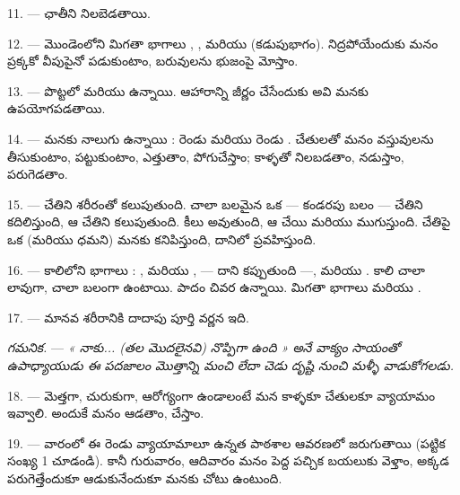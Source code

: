 11. ---  ఛాతీని నిలబెడతాయి.

12. --- మొండెంలోని మిగతా భాగాలు , ,  మరియు
 (కడుపుభాగం). నిద్రపోయేందుకు మనం ప్రక్కకో వీపుపైనో పడుకుంటాం, బరువులను భుజంపై
మోస్తాం.

13. --- పొట్టలో  మరియు  ఉన్నాయి. ఆహారాన్ని జీర్ణం చేసేందుకు అవి
మనకు ఉపయోగపడతాయి.

\VUsaut{4.4mm}
\VUsaut{3.0mm}

14. --- మనకు నాలుగు  ఉన్నాయి : రెండు  మరియు రెండు
. చేతులతో మనం వస్తువులను తీసుకుంటాం, పట్టుకుంటాం, ఎత్తుతాం, పోగుచేస్తాం;
కాళ్ళతో నిలబడతాం, నడుస్తాం, పరుగెడతాం.

15. ---  చేతిని శరీరంతో కలుపుతుంది. చాలా బలమైన ఒక  — కండరపు బలం —
చేతిని కదిలిస్తుంది, ఆ చేతిని   కలుపుతుంది. 
 కీలు అవుతుంది, ఆ చేయి  మరియు  ముగుస్తుంది.
చేతిపై ఒక  (మరియు ధమని) మనకు కనిపిస్తుంది, దానిలో  ప్రవహిస్తుంది.

16. --- కాలిలోని భాగాలు : ,  మరియు ,
 — దాని   కప్పుతుంది —,  మరియు
. కాలి  చాలా లావుగా, చాలా బలంగా ఉంటాయి. పాదం చివర
 ఉన్నాయి. మిగతా భాగాలు  మరియు .

17. --- మానవ శరీరానికి దాదాపు పూర్తి వర్ణన ఇది.

\textit{గమనిక.} ---
\textit{« నాకు... (తల మొదలైనవి) నొప్పిగా ఉంది » అనే వాక్యం సాయంతో ఉపాధ్యాయుడు ఈ పదజాలం మొత్తాన్ని మంచి లేదా చెడు}
 \textit{దృష్టి నుంచి మళ్ళీ వాడుకోగలడు.}

\VUsaut{5.0mm}
\VUsaut{2.4mm}
\VUsaut{3.0mm}

18. --- మెత్తగా, చురుకుగా, ఆరోగ్యంగా ఉండాలంటే మన కాళ్ళకూ చేతులకూ వ్యాయామం ఇవ్వాలి. అందుకే మనం
ఆడతాం,  చేస్తాం.

19. --- వారంలో ఈ రెండు వ్యాయామాలూ ఉన్నత పాఠశాల ఆవరణలో జరుగుతాయి (పట్టిక సంఖ్య 1 చూడండి). కానీ
గురువారం, ఆదివారం మనం పెద్ద పచ్చిక బయలుకు వెళ్తాం, అక్కడ పరుగెత్తేందుకూ ఆడుకునేందుకూ మనకు చోటు
ఉంటుంది.

